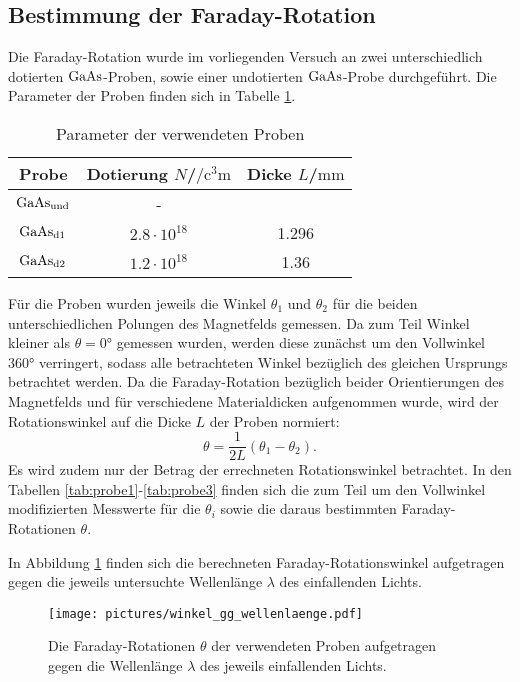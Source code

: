 \subsection{Bestimmung der Faraday-Rotation}
Die Faraday-Rotation wurde im vorliegenden Versuch an zwei unterschiedlich dotierten $\ce{GaAs}$-Proben, sowie einer undotierten $\ce{GaAs}$-Probe durchgeführt.
Die Parameter der Proben finden sich in Tabelle \ref{tab:params}.
\begin{table}
  \centering
  \caption{Parameter der verwendeten Proben}
  \label{tab:params}
  \begin{tabular}{ccc}
    \toprule
    Probe&Dotierung $N$/$\si{\per\cubic\centi\metre}$&Dicke $L$/$\si{\milli\meter}$\\
    \midrule
    $\ce{GaAs}_{\mathrm{und}}$&-&\\
    $\ce{GaAs}_{\mathrm{d1}}$&$2.8\cdot 10^{18}$&1.296\\
    $\ce{GaAs}_{\mathrm{d2}}$&$1.2\cdot 10^{18}$&1.36\\
    \bottomrule
  \end{tabular}
\end{table}

Für die Proben wurden jeweils die Winkel $\theta_1$ und $\theta_2$ für die beiden unterschiedlichen Polungen des Magnetfelds gemessen. Da zum Teil Winkel kleiner als $\theta=\ang{0}$ gemessen wurden, werden diese zunächst um den Vollwinkel $\ang{360}$ verringert, sodass alle betrachteten Winkel bezüglich des gleichen Ursprungs betrachtet werden.
Da die Faraday-Rotation bezüglich beider Orientierungen des Magnetfelds und für verschiedene Materialdicken aufgenommen wurde, wird der Rotationswinkel auf die Dicke $L$ der Proben normiert:
\begin{equation}
  \theta=\frac{1}{2L}\left(\theta_1-\theta_2\right)\mathrm{.}
\end{equation}
Es wird zudem nur der Betrag der errechneten Rotationswinkel betrachtet.
In den Tabellen \ref{tab:probe1}-\ref{tab:probe3} finden sich die zum Teil um den Vollwinkel modifizierten Messwerte für die $\theta_i$ sowie die daraus bestimmten Faraday-Rotationen $\theta$.



In Abbildung \ref{fig:faraday} finden sich die berechneten Faraday-Rotationswinkel aufgetragen gegen die jeweils untersuchte Wellenlänge $\lambda$ des einfallenden Lichts.

\begin{figure}
  \centering
  \texttt{[image: pictures/winkel\_gg\_wellenlaenge.pdf]}
  \caption{Die Faraday-Rotationen $\theta$ der verwendeten Proben aufgetragen gegen die Wellenlänge $\lambda$ des jeweils einfallenden Lichts.}
  \label{fig:faraday}
\end{figure}
